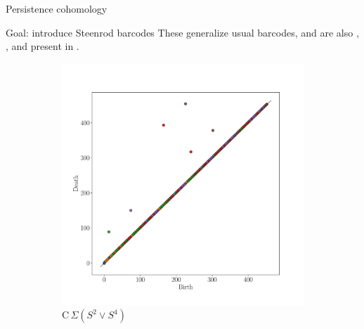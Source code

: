 
\begin{frame}
	\centering
	\vspace*{2.6cm}
	\Huge {}
	\vskip 20pt
	\Large Persistence cohomology
\end{frame}

\begin{frame}{Goal: introduce Steenrod barcodes}
	\pause
	These generalize usual barcodes, and are also
	\pause
	,
	\pause
	,
	\pause
	and present in .

	\pause\medskip
	\vskip-15pt
	\begin{figure}
		\centering
		\begin{subfigure}[b]{0.49\textwidth}
			\centering
			\includegraphics[width=\textwidth]{aux/s2_s4.pdf}
			\caption{$\mathrm C\,\Sigma(S^2 \vee S^4)$}
			\label{f:s2_s4}
		\end{subfigure}
		\pause
		\begin{subfigure}[b]{0.49\textwidth}
			\centering

\end{subfigure}
\end{figure}
\end{frame}
